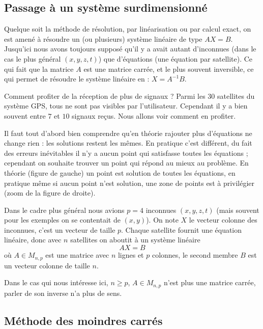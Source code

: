 \documentclass[class=report,crop=false]{standalone}
\begin{document}
\subsection{Passage à un système surdimensionné}


Quelque soit la méthode de résolution, par linéarisation ou par 
calcul exact, on est amené à résoudre un (ou plusieurs) système linéaire
de type $AX=B$.
Jusqu'ici nous avons toujours supposé qu'il y a avait autant d'inconnues
(dans le cas le plus général $(x,y,z,t)$)
que d'équations (une équation par satellite). Ce qui fait que la matrice $A$ est une matrice 
carrée, et le plus souvent inversible, ce qui permet de résoudre le système linéaire
en : $X = A^{-1} B$.

Comment profiter de la réception de plus de signaux ? Parmi les $30$ satellites
du système GPS, tous ne sont pas \og visibles \fg{} par l'utilisateur.
Cependant il y a bien souvent entre $7$ et $10$ signaux reçus.
Nous allons voir comment en profiter. 


Il faut tout d'abord bien comprendre qu'en théorie rajouter plus d'équations
ne change rien : les solutions restent les mêmes.
En pratique c'est différent, du fait des erreurs inévitables il n'y a aucun point
qui satisfasse toutes les équations ; cependant on souhaite trouver un point
qui répond au mieux au problème.
En théorie (figure de gauche) un point est solution de toutes les équations,
en pratique même si aucun point n'est solution, une zone de points est à privilégier
(zoom de la figure de droite).


Dans le cadre plus général nous avions $p=4$ inconnues $(x,y,z,t)$
(mais souvent pour les exemples on se contentait de $(x,y)$).
On note $X$ le vecteur colonne des inconnues, c'est un vecteur de taille $p$.
Chaque satellite fournit une équation linéaire, donc avec $n$ satellites
on aboutit à un système linéaire 
$$AX=B$$
où $A \in M_{n,p}$ est une matrice avec $n$ lignes et $p$ colonnes,
le second membre $B$ est un vecteur colonne de taille $n$.

Dans le cas qui nous intéresse ici, $n\ge p$, 
$A\in M_{n,p}$ n'est plus une matrice carrée,
parler de son inverse n'a plus de sens.

\subsection{Méthode des moindres carrés}
\end{document}
